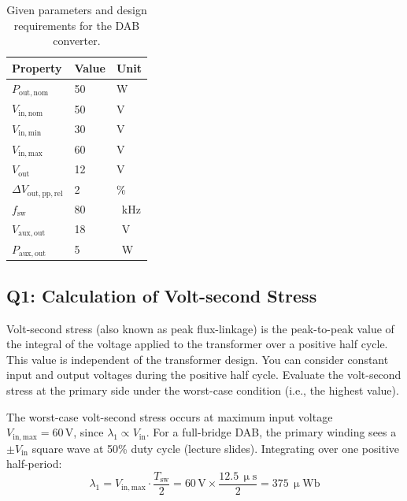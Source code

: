 \documentclass{PELsmallreport}
\begin{document}
\begin{table}[H]
\caption{Given parameters and design requirements for the DAB converter.}
\centering
\label{Tab:Specs}
    \begin{tabular}{|l|l|l|}
      \hline
      \textbf{Property} & \textbf{Value} & \textbf{Unit} \\
      \hline
      $P_\mathrm{out,nom}$ & 50 & \si{\watt} \\ \hline
      $V_\mathrm{in,nom}$ & 50 & \si{\volt} \\ \hline
      $V_\mathrm{in,min}$ & 30  & \si{\volt} \\ \hline
      $V_\mathrm{in,max}$ & 60 & \si{\volt} \\ \hline  
      $V_\mathrm{out}$ & 12 & \si{\volt} \\ \hline
      $\Delta V_\mathrm{out,pp,rel}$ & 2 & \% \\ \hline
      $f_\mathrm{sw}$ & 80 & \qty{}{\kHz} \\ \hline
      $V_\mathrm{aux,out} $ & \qty{18}{} & \qty{}{\V} \\ \hline
      $P_\mathrm{aux,out} $ & \qty{5}{} & \qty{}{\W} \\ \hline
    \end{tabular}
\end{table}







\newpage
\subsection{Q1: Calculation of Volt-second Stress} 
Volt-second stress (also known as peak flux-linkage) is the peak-to-peak value of the integral of the voltage applied to the transformer over a positive half cycle. 
This value is independent of the transformer design.  
You can consider constant input and output voltages during the positive half cycle. 
Evaluate the volt-second stress at the primary side under the worst-case condition (i.e., the highest value). 
\\

\begin{framed}
The worst-case volt-second stress occurs at maximum input voltage $V_\mathrm{in,max} = 60\,\mathrm{V}$, since $\lambda_1 \propto V_\mathrm{in}$.
For a full-bridge DAB, the primary winding sees a $\pm V_\mathrm{in}$ square wave at 50\% duty cycle (lecture slides). Integrating over one positive half-period:
\begin{equation}
    \lambda_1 = V_\mathrm{in,max} \cdot \frac{T_\mathrm{sw}}{2} = 60\,\mathrm{V} \times \frac{12.5\,\upmu\mathrm{s}}{2} = 375\,\upmu\mathrm{Wb}
\end{equation}
\end{framed}
\end{document}
